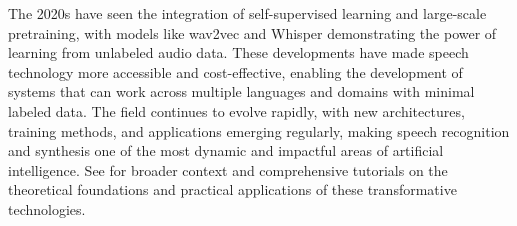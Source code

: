 The 2020s have seen the integration of self-supervised learning and large-scale pretraining, with models like wav2vec and Whisper demonstrating the power of learning from unlabeled audio data. These developments have made speech technology more accessible and cost-effective, enabling the development of systems that can work across multiple languages and domains with minimal labeled data. The field continues to evolve rapidly, with new architectures, training methods, and applications emerging regularly, making speech recognition and synthesis one of the most dynamic and impactful areas of artificial intelligence. See \textcite{Prince2023} for broader context and comprehensive tutorials on the theoretical foundations and practical applications of these transformative technologies.

